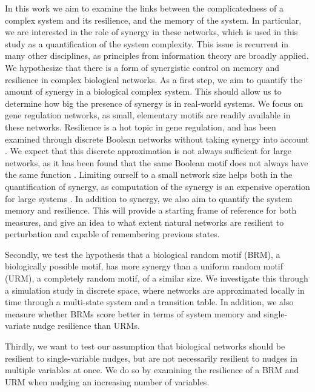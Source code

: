 \documentclass[../main.tex]{subfiles}
\begin{document}
In this work we aim to examine the links between the complicatedness of a complex system and its resilience, and the memory of the system.
In particular, we are interested in the role of synergy in these networks, which is used in this study as a quantification of the system complexity.
This issue is recurrent in many other disciplines, as principles from information theory are broadly applied.
We hypothesize that there is a form of synergistic control on memory and resilience in complex biological networks.
As a first step, we aim to quantify the amount of synergy in a biological complex system.
This should allow us to determine how big the presence of synergy is in real-world systems.
We focus on gene regulation networks, as small, elementary motifs are readily available in these networks.
Resilience is a hot topic in gene regulation, and has been examined through discrete Boolean networks without taking synergy into account \cite{peixoto2012emergence}.
We expect that this discrete approximation is not always sufficient for large networks, as it has been found that the same Boolean motif does not always have the same function \cite{ingram2006network}.
Limiting ourself to a small network size helps both in the quantification of synergy, as computation of the synergy is an expensive operation for large systems \cite{jointpdf}.
In addition to synergy, we also aim to quantify the system memory and resilience.
This will provide a starting frame of reference for both measures, and give an idea to what extent natural networks are resilient to perturbation and capable of remembering previous states.

Secondly, we test the hypothesis that a biological random motif (BRM), a biologically possible motif, has more synergy than a uniform random motif (URM), a completely random motif, of a similar size.
We investigate this through a simulation study in discrete space, where networks are approximated locally in time through a multi-state system and a transition table.
In addition, we also measure whether BRMs score better in terms of system memory and single-variate nudge resilience than URMs. %

Thirdly, we want to test our assumption that biological networks should be resilient to single-variable nudges, but are not necessarily resilient to nudges in multiple variables at once.
We do so by examining the resilience of a BRM and URM when nudging an increasing number of variables.
\end{document}
